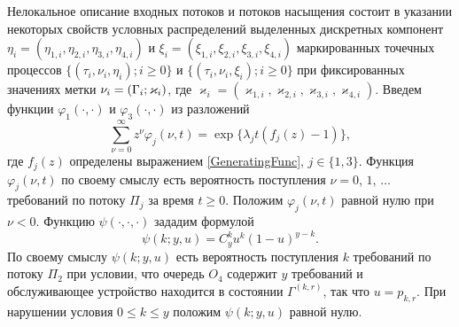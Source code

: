 \documentclass{report}
\begin{document}
Нелокальное описание входных потоков и потоков насыщения состоит в указании некоторых свойств условных распределений выделенных дискретных компонент $\eta_i=(\eta_{1,i},\eta_{2,i}, \eta_{3,i}, \eta_{4,i})$ и $\xi_i=(\xi_{1,i}, \xi_{2,i}, \xi_{3,i}, \xi_{4,i})$ маркированных точечных процессов \linebreak $\{(\tau_i, \nu_i, \eta_i); i\geqslant 0\}$ и $\{(\tau_i, \nu_i, \xi_i); i\geqslant 0\}$ при фиксированных значениях метки $\nu_i \hm= (\Gamma_i;\varkappa_i)$, где $\varkappa_i=(\varkappa_{1,i},\varkappa_{2,i},\varkappa_{3,i},\varkappa_{4,i})$. 
Введем функции $\varphi_1(\cdot,\cdot)$ и $\varphi_3(\cdot,\cdot)$ из разложений 
\begin{equation*}
\sum_{\nu=0}^{\infty} z^\nu\varphi_j(\nu,t) = \exp\{\lambda_j t (f_j(z)-1)\},
\end{equation*}
где $f_j(z)$ определены выражением \eqref{GeneratingFunc}, $j \in \{1,3\}$. Функция $\varphi_j(\nu,t)$ по своему смыслу есть вероятность поступления $\nu=0$, $1$, $\ldots$ требований по потоку $\Pi_j$ за время $t \geqslant 0$. Положим $\varphi_j(\nu,t)$ равной нулю при $\nu < 0$. Функцию $\psi(\cdot,\cdot,\cdot)$ зададим формулой
\begin{equation*}
\psi(k;y,u)=C_y^k u^k (1-u)^{y-k}.	
\end{equation*}
По своему смыслу $\psi(k;y,u)$ есть вероятность поступления $k$ требований по потоку $\Pi_2$ при условии, что очередь $O_4$ содержит $y$ требований и обслуживающее устройство находится в состоянии $\Gamma^{(k,r)}$, так что $u=p_{k,r}$. При нарушении условия $ 0\leqslant k \leqslant y$ положим $\psi(k;y,u)$ равной нулю.
\end{document}

